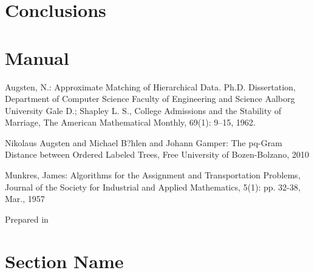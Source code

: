 \documentclass[a4paper,11pt]{article}
\begin{document}
\section{Conclusions}

\section{Manual}


\begin{thebibliography}{9999}
Augsten, N.: Approximate Matching of Hierarchical Data. 
Ph.D. Dissertation, Department of Computer Science Faculty of Engineering and Science Aalborg University
Gale D.; Shapley L. S., College Admissions and the Stability of Marriage, The American Mathematical Monthly,  69(1): 9–15, 1962.

Nikolaus Augsten and Michael B?hlen and Johann Gamper: The pq-Gram Distance between Ordered Labeled Trees, Free University of Bozen-Bolzano, 2010 

Munkres, James: Algorithms for the Assignment and Transportation Problems, Journal of the Society for Industrial and Applied Mathematics, 5(1): pp. 32-38, Mar., 1957

\end{thebibliography}
\vfill
\begin{flushright}\small Prepared in \LaTeXe\ \end{flushright}

\appendix
\section{Section Name}
\end{document}
